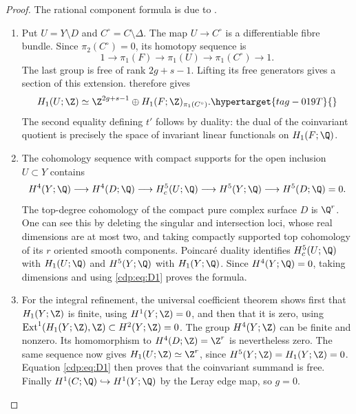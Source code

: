 \begin{proof}
The rational component formula is due to \citet[Section~10.5, p.~91]{AC2026}.

\begin{enumerate}[leftmargin=*]
\item Put $U=Y\setminus D$ and $C^\circ=C\setminus\Delta$.
The map $U\to C^\circ$ is a differentiable fibre bundle. Since
$\pi_2(C^\circ)=0$, its homotopy sequence is
\[
1\longrightarrow\pi_1(F)\longrightarrow\pi_1(U)
 \longrightarrow\pi_1(C^\circ)\longrightarrow1.
\]
The last group is free of rank $2g+s-1$. Lifting its free generators
gives a section of this extension. \citet[Lemma~10.7, p.~90]{AC2026} therefore gives
\begin{equation}
H_1(U;\Z)\simeq
\Z^{2g+s-1}\oplus H_1(F;\Z)_{\pi_1(C^\circ)}.       \hypertarget{tag-019T}{}\label{cdp:eq:D1}
\end{equation}
The second equality defining $t'$ follows by duality: the dual of
the coinvariant quotient is precisely the space of invariant
linear functionals on $H_1(F;\Q)$.

\item The cohomology sequence with compact supports for the open inclusion
$U\subset Y$ contains
\[
H^4(Y;\Q)\longrightarrow H^4(D;\Q)
\longrightarrow H_c^5(U;\Q)
\longrightarrow H^5(Y;\Q)\longrightarrow H^5(D;\Q)=0.
\]
The top-degree cohomology of the compact pure complex surface $D$
is $\Q^r$. One can see this by deleting the singular and intersection
loci, whose real dimensions are at most two, and taking compactly
supported top cohomology of its $r$ oriented smooth components.
Poincar\'e duality identifies $H_c^5(U;\Q)$ with $H_1(U;\Q)$ and
$H^5(Y;\Q)$ with $H_1(Y;\Q)$. Since $H^4(Y;\Q)=0$, taking
dimensions and using \eqref{cdp:eq:D1} proves the formula.

\item For the integral refinement, the universal coefficient theorem shows
first that $H_1(Y;\Z)$ is finite, using $H^1(Y;\Z)=0$, and then that
it is zero, using
$\operatorname{Ext}^1(H_1(Y;\Z),\Z)\subset H^2(Y;\Z)=0$.
The group $H^4(Y;\Z)$ can be finite and nonzero. Its homomorphism
to $H^4(D;\Z)=\Z^r$ is nevertheless zero. The same sequence now
gives $H_1(U;\Z)\simeq\Z^r$, since $H^5(Y;\Z)=H_1(Y;\Z)=0$.
Equation \eqref{cdp:eq:D1} then proves that the coinvariant summand is free.
Finally $H^1(C;\Q)\hookrightarrow H^1(Y;\Q)$ by the Leray edge
map, so $g=0$.

\end{enumerate}
\end{proof}